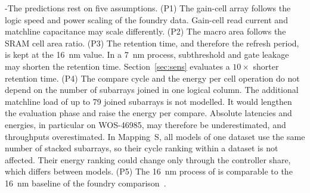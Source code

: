 \begin{table}[!htbp]
\small
\centering
\caption{\gainp{} parameters: 16~nm reference values from~\cite{levi2026gainp} and predicted 7~nm corners.}
\label{tab:params7}

\end{table}

\hyp{The predictions rest on five assumptions.
(P1) The gain-cell array follows the logic speed and power scaling of the foundry data. Gain-cell read current and matchline capacitance may scale differently.
(P2) The macro area follows the SRAM cell area ratio.
(P3) The retention time, and therefore the refresh period, is kept at the 16~nm value. In a 7~nm process, subthreshold and gate leakage may shorten the retention time. Section~\ref{sec:sens} evaluates a $10\times$ shorter retention time.
(P4) The compare cycle and the energy per cell operation do not depend on the number of subarrays joined in one logical column. The additional matchline load of up to 79 joined subarrays is not modelled. It would lengthen the evaluation phase and raise the energy per compare. Absolute latencies and energies, in particular on WOS-46985, may therefore be underestimated, and throughputs overestimated. In Mapping~S, all models of one dataset use the same number of stacked subarrays, so their cycle ranking within a dataset is not affected. Their energy ranking could change only through the controller share, which differs between models.
(P5) The 16~nm process of \gainp{} is comparable to the 16~nm baseline of the foundry comparison~\cite{wu2016n7,wu2013n16}.}
